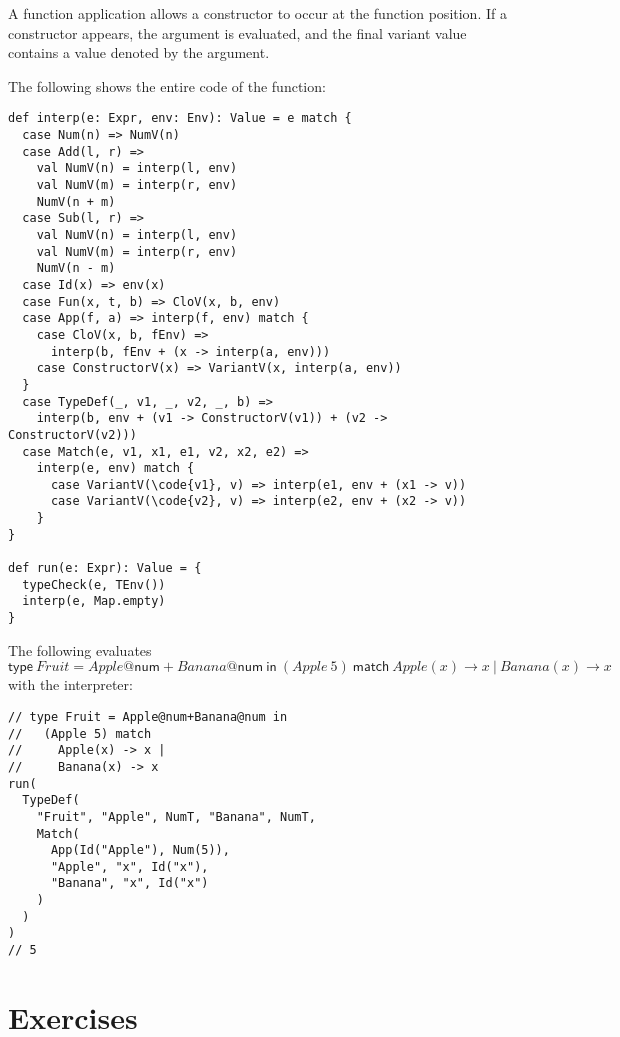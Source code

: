 A function application allows a constructor to occur at the function position.
If a constructor appears, the argument is evaluated, and the final variant value
contains a value denoted by the argument.

The following shows the entire code of the  function:

\begin{verbatim}
def interp(e: Expr, env: Env): Value = e match {
  case Num(n) => NumV(n)
  case Add(l, r) =>
    val NumV(n) = interp(l, env)
    val NumV(m) = interp(r, env)
    NumV(n + m)
  case Sub(l, r) =>
    val NumV(n) = interp(l, env)
    val NumV(m) = interp(r, env)
    NumV(n - m)
  case Id(x) => env(x)
  case Fun(x, t, b) => CloV(x, b, env)
  case App(f, a) => interp(f, env) match {
    case CloV(x, b, fEnv) =>
      interp(b, fEnv + (x -> interp(a, env)))
    case ConstructorV(x) => VariantV(x, interp(a, env))
  }
  case TypeDef(_, v1, _, v2, _, b) =>
    interp(b, env + (v1 -> ConstructorV(v1)) + (v2 -> ConstructorV(v2)))
  case Match(e, v1, x1, e1, v2, x2, e2) =>
    interp(e, env) match {
      case VariantV(\code{v1}, v) => interp(e1, env + (x1 -> v))
      case VariantV(\code{v2}, v) => interp(e2, env + (x2 -> v))
    }
}

def run(e: Expr): Value = {
  typeCheck(e, TEnv())
  interp(e, Map.empty)
}
\end{verbatim}

The following evaluates $\textsf{type}\
Fruit=Apple@\textsf{num}+Banana@\textsf{num}\ \textsf{in}\ (Apple\ 5)\
\textsf{match}\ Apple(x)\rightarrow x\ |\ Banana(x)\rightarrow x$ with the
interpreter:

\begin{verbatim}
// type Fruit = Apple@num+Banana@num in
//   (Apple 5) match
//     Apple(x) -> x |
//     Banana(x) -> x
run(
  TypeDef(
    "Fruit", "Apple", NumT, "Banana", NumT,
    Match(
      App(Id("Apple"), Num(5)),
      "Apple", "x", Id("x"),
      "Banana", "x", Id("x")
    )
  )
)
// 5
\end{verbatim}

\section{Exercises}

